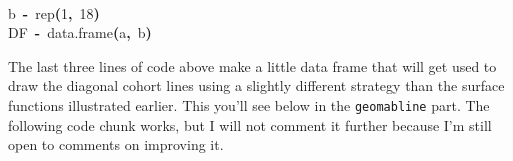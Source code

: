 \documentclass[a4paper]{article}
\newcommand{\hlnumber}[1]{\textcolor[rgb]{0.0823529411764706,0.0784313725490196,0.709803921568627}{#1}}%
\newcommand{\hlfunctioncall}[1]{\textcolor[rgb]{1,0,0}{#1}}%
\newcommand{\hlkeyword}[1]{\textcolor[rgb]{0,0,0}{\textbf{#1}}}%
\newcommand{\hlassignement}[1]{\textcolor[rgb]{0.215686274509804,0.215686274509804,0.384313725490196}{\textbf{#1}}}%
\newcommand{\hlsymbol}[1]{\textcolor[rgb]{0,0,0}{#1}}%
\newcommand{\hlprompt}[1]{\textcolor[rgb]{0,0,0}{#1}}%
\newcommand{\hlstd}[1]{\textcolor[rgb]{0,0,0}{#1}}%
\newenvironment{Houtput}{\raggedright}{%
%
}
\begin{document}
\begin{Houtput}
\normalfont
\hspace*{\fill}\\
\hlstd{}\ttfamily\noindent
\hlprompt{\usebox{\hlnormalsizeboxgreaterthan}{\ }}\hlsymbol{b}{\ }\hlassignement{\usebox{\hlnormalsizeboxlessthan}-}{\ }\hlfunctioncall{rep}\hlkeyword{(}\hlnumber{1}\hlkeyword{,}{\ }\hlnumber{18}\hlkeyword{)}\mbox{}
\normalfont
\hspace*{\fill}\\
\hlstd{}\ttfamily\noindent
\hlprompt{\usebox{\hlnormalsizeboxgreaterthan}{\ }}\hlsymbol{DF}{\ }\hlassignement{\usebox{\hlnormalsizeboxlessthan}-}{\ }\hlfunctioncall{data.frame}\hlkeyword{(}\hlsymbol{a}\hlkeyword{,}{\ }\hlsymbol{b}\hlkeyword{)}\mbox{}
\normalfont
\hspace*{\fill}\\
\hlstd{}
\end{Houtput}

The last three lines of code above make a little data frame that will get used to draw the diagonal cohort lines using a slightly different strategy than the surface functions illustrated earlier. This you'll see below in the \texttt{geom\textunderscore abline} part. The following code chunk works, but I will not comment it further because I'm still open to comments on improving it.
\end{document}
